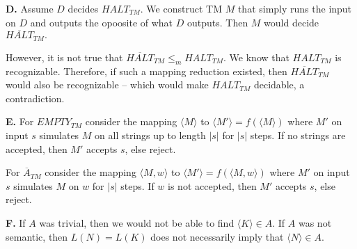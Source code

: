\documentclass[10pt]{article}
\begin{document}
\noindent
\textbf{D. }Assume $D$ decides $\textit{HALT}_{TM}.$ We construct TM $M$ that simply runs the input on $D$ and outputs the opoosite of what $D$ outputs. Then $M$ would decide $\overline{\textit{HALT}}_{TM}.$

However, it is not true that $\overline{\textit{HALT}}_{TM}\le_m \textit{HALT}_{TM}.$ We know that $\textit{HALT}_{TM}$ is recognizable. Therefore, if such a mapping reduction existed, then $\overline{\textit{HALT}}_{TM}$ would also be recognizable -- which would make $\textit{HALT}_{TM}$ decidable, a contradiction.

\noindent
\textbf{E. }For $\textit{EMPTY}_{TM}$ consider the mapping $\langle M\rangle$ to $\langle M' \rangle = f(\langle M\rangle)$ where $M'$ on input $s$ simulates $M$ on all strings up to length $|s|$ for $|s|$ steps. If no strings are accepted, then $M'$ accepts $s$, else reject.

For $\overline{A}_{TM}$ consider the mapping $\langle M, w\rangle$ to $\langle M' \rangle = f(\langle M, w\rangle)$ where $M'$ on input $s$ simulates $M$ on $w$ for $|s|$ steps. If $w$ is not accepted, then $M'$ accepts $s$, else reject.

\noindent
\textbf{F. }If $A$ was trivial, then we would not be able to find $\langle K\rangle\in A.$ If $A$ was not semantic, then $L(N)=L(K)$ does not necessarily imply that $\langle N\rangle\in A$. 
\end{document}
